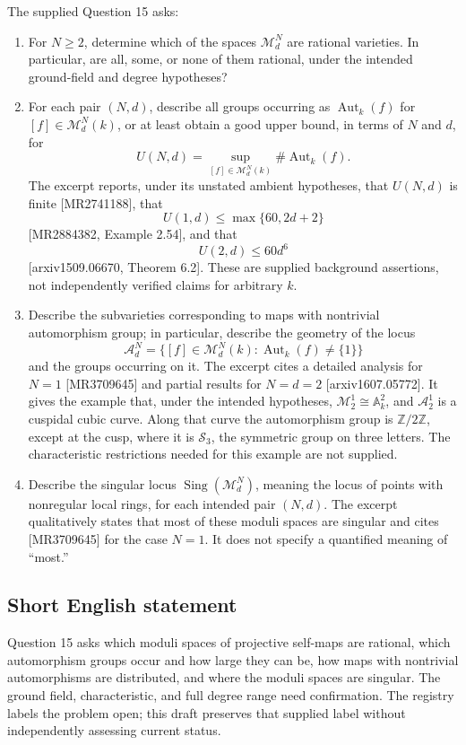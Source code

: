 \documentclass[11pt]{article}
\newcommand{\Z}{\mathbb{Z}}
\begin{document}
The supplied Question 15 asks:
\begin{enumerate}
\item[(a)] For \(N\geq 2\), determine which of the spaces \(\mathcal M_d^N\) are rational varieties. In particular, are all, some, or none of them rational, under the intended ground-field and degree hypotheses?

\item[(b)] For each pair \((N,d)\), describe all groups occurring as \(\operatorname{Aut}_k(f)\) for \([f]\in\mathcal M_d^N(k)\), or at least obtain a good upper bound, in terms of \(N\) and \(d\), for
\[
U(N,d)=\sup_{[f]\in\mathcal M_d^N(k)}\#\operatorname{Aut}_k(f).
\]
The excerpt reports, under its unstated ambient hypotheses, that \(U(N,d)\) is finite [MR2741188], that
\[
U(1,d)\leq\max\{60,2d+2\}
\]
[MR2884382, Example 2.54], and that
\[
U(2,d)\leq 60d^6
\]
[arxiv1509.06670, Theorem 6.2]. These are supplied background assertions, not independently verified claims for arbitrary \(k\).

\item[(c)] Describe the subvarieties corresponding to maps with nontrivial automorphism group; in particular, describe the geometry of the locus
\[
\mathcal A_d^N=\{[f]\in\mathcal M_d^N(k):\operatorname{Aut}_k(f)\neq\{1\}\}
\]
and the groups occurring on it. The excerpt cites a detailed analysis for \(N=1\) [MR3709645] and partial results for \(N=d=2\) [arxiv1607.05772]. It gives the example that, under the intended hypotheses, \(\mathcal M_2^1\cong\mathbb A_k^2\), and \(\mathcal A_2^1\) is a cuspidal cubic curve. Along that curve the automorphism group is \(\Z/2\Z\), except at the cusp, where it is \(\mathcal S_3\), the symmetric group on three letters. The characteristic restrictions needed for this example are not supplied.

\item[(d)] Describe the singular locus \(\operatorname{Sing}(\mathcal M_d^N)\), meaning the locus of points with nonregular local rings, for each intended pair \((N,d)\). The excerpt qualitatively states that most of these moduli spaces are singular and cites [MR3709645] for the case \(N=1\). It does not specify a quantified meaning of ``most.''
\end{enumerate}
\subsection{Short English statement}
Question 15 asks which moduli spaces of projective self-maps are rational, which automorphism groups occur and how large they can be, how maps with nontrivial automorphisms are distributed, and where the moduli spaces are singular. The ground field, characteristic, and full degree range need confirmation. The registry labels the problem open; this draft preserves that supplied label without independently assessing current status.
\end{document}
